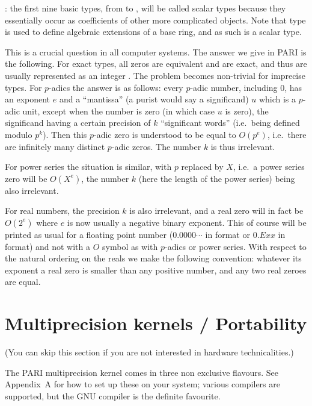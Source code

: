: the first nine basic types, from
 to , will be called scalar types because they
essentially occur as coefficients of other more complicated objects. Note
that type  is used to define algebraic extensions of a base ring,
and as such is a scalar type.

 This is a crucial question in all computer
systems. The answer we give in PARI is the following. For exact types, all
zeros are equivalent and are exact, and thus are usually represented as an
integer . The problem becomes non-trivial for imprecise types. For
$p$-adics the answer is as follows: every $p$-adic number, including 0, has
an exponent $e$ and a ``mantissa'' (a purist would say a significand) $u$
which is a $p$-adic unit, except when the number is zero (in which case $u$
is zero), the significand having a certain precision of $k$ ``significant
words'' (i.e.~being defined modulo $p^k$). Then this $p$-adic zero is
understood to be equal to $O(p^e)$, i.e.~there are infinitely many distinct
$p$-adic zeros. The number $k$ is thus irrelevant.

For power series the situation is similar, with $p$ replaced by $X$, i.e.~a
power series zero will be $O(X^e)$, the number $k$ (here the length of the
power series) being also irrelevant.\label{se:whatzero}

For real numbers, the precision $k$ is also irrelevant, and a real zero will
in fact be $O(2^e)$ where $e$ is now usually a negative binary exponent. This
of course will be printed as usual for a floating point number
($0.0000\cdots$ in  format or $0.Exx$ in  format) and not with
a $O$ symbol as with $p$-adics or power series. With respect to the natural
ordering on the reals we make the following convention: whatever its exponent
a real zero is smaller than any positive number, and any two real zeroes are
equal.

\section{Multiprecision kernels / Portability} (You can skip this section
if you are not interested in hardware technicalities.)

The PARI multiprecision kernel comes in three non exclusive flavours. See
Appendix~A for how to set up these on your system; various compilers are
supported, but the GNU  compiler is the definite favourite.

